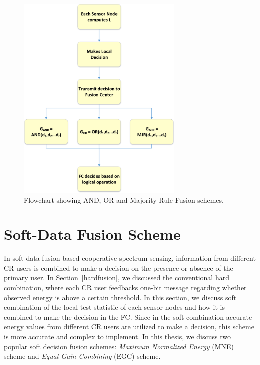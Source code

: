 \begin{figure}[ht!]
	\centering
	\includegraphics[width=\textwidth,height=10cm,keepaspectratio]{images/Gill/figs/hardfusion.eps}
\caption{Flowchart showing AND, OR and Majority Rule Fusion schemes.} 
\label{hard}      
\end{figure}

\section{Soft-Data Fusion Scheme}

In soft-data fusion based cooperative spectrum sensing, information from different CR users is combined to make a decision on the presence or absence of the primary user. In Section~\ref{hardfusion}, we discussed the conventional hard combination, where each CR user feedbacks one-bit message regarding whether observed energy is above a certain threshold. In this section, we discuss soft combination of the local test statistic of each sensor nodes and how it is combined to make the decision in the FC. Since in the soft combination accurate energy values from different CR users are utilized to make a decision, this scheme is more accurate and complex to implement. In this thesis, we discuss two popular soft decision fusion schemes: \textit{Maximum Normalized Energy} (MNE) scheme and \textit{Equal Gain Combining} (EGC) scheme.

